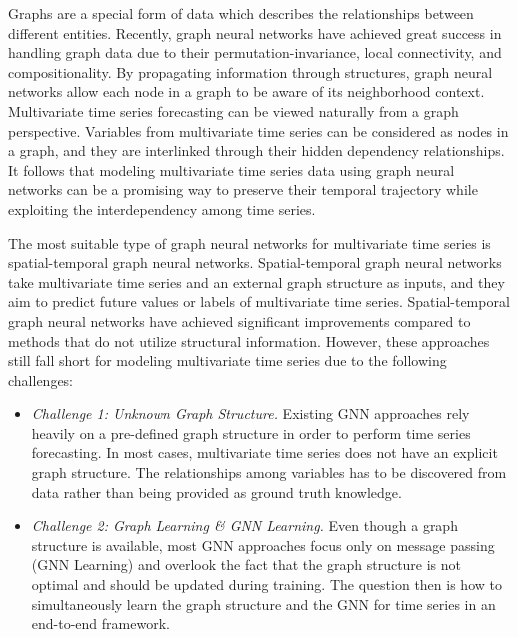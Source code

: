 \documentclass[sigconf]{acmart}
\begin{document}
Graphs are a special form of data which describes the relationships between different entities. Recently, graph neural networks have achieved great success in handling graph data due to their permutation-invariance, local connectivity, and compositionality. By propagating information through structures, graph neural networks allow each node in a graph to be aware of its neighborhood context. Multivariate time series forecasting can be viewed naturally from a graph perspective. Variables from multivariate time series can be considered as nodes in a graph, and they are interlinked through their hidden dependency relationships. It follows that modeling multivariate time series data using graph neural networks can be a promising way to preserve their temporal trajectory while exploiting the interdependency among time series.

The most suitable type of graph neural networks for multivariate time series is spatial-temporal graph neural networks. Spatial-temporal graph neural networks take multivariate time series and an external graph structure as inputs, and they aim to predict future values or labels of multivariate time series. Spatial-temporal graph neural networks have achieved significant improvements compared to methods that do not utilize structural information. 
However, these approaches still fall short for modeling multivariate time series due to the following challenges:
\begin{itemize}
    \item \textit{Challenge 1: Unknown Graph Structure.} Existing GNN approaches rely heavily on a pre-defined graph structure in order to perform time series forecasting. In most cases, multivariate time series does not have an explicit graph structure. The relationships among variables has to be discovered from data rather than being provided as ground truth knowledge.
    \item \textit{Challenge 2: Graph Learning \& GNN Learning. } Even though a graph structure is available, most GNN approaches focus only on message passing (GNN Learning) and overlook the fact that the graph structure is not optimal and should be updated during training. The question then is how to simultaneously learn the graph structure and the GNN for time series in an end-to-end framework.
\end{itemize}
\end{document}
